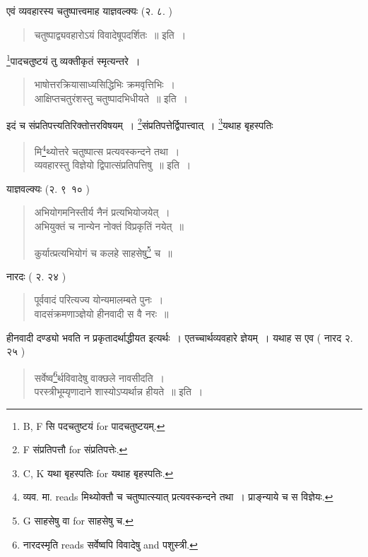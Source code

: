 \documentclass[11pt, openany]{book}
\begin{document}
एवं व्यवहारस्य चतुष्पात्त्वमाह याज्ञवल्क्यः (२. ८. )

\begin{quote}
{\vy चतुष्पाद्व्यवहारोऽयं विवादेषूपदर्शितः~॥} इति~।
\end{quote}

\renewcommand{\thefootnote}{2}\footnote{B, F सि पदचतुष्टयं for पादचतुष्टयम्.}पादचतुष्टयं तु व्यक्तीकृतं स्मृत्यन्तरे~। 

\begin{quote}
{\vy भाषोत्तरक्रियासाध्यसिद्धिभिः क्रमवृत्तिभिः~।\\
आक्षिप्तचतुरंशस्तु चतुष्पादभिधीयते~॥} इति~।
\end{quote}

इदं च संप्रतिपत्त्यतिरिक्तोत्तरविषयम्~। \renewcommand{\thefootnote}{3}\footnote{F संप्रतिपत्तौ for संप्रतिपत्तेः.}संप्रतिपत्तेर्द्विपात्त्वात्~। \renewcommand{\thefootnote}{4}\footnote{C, K यथा बृहस्पतिः for यथाह बृहस्पतिः.}यथाह बृहस्पतिः

\begin{quote}
{\vy मि\renewcommand{\thefootnote}{5}\footnote{व्यव. मा. reads मिथ्योक्तौ च चतुष्पात्स्यात् प्रत्यवस्कन्दने तथा~। प्राङ्न्याये च स विज्ञेयः.}थ्योत्तरे चतुष्पात्स प्रत्यवस्कन्दने तथा~।\\
व्यवहारस्तु विज्ञेयो द्विपात्संप्रतिपत्तिषु~॥} इति~।
\end{quote}

याज्ञवल्क्यः (२. ९\textendash\ १० ) 

\begin{quote}
{\vy अभियोगमनिस्तीर्य नैनं प्रत्यभियोजयेत्~।\\
अभियुक्तं च नान्येन नोक्तं विप्रकृतिं नयेत्~॥

कुर्यात्प्रत्यभियोगं च कलहे साहसेषु\renewcommand{\thefootnote}{6}\footnote{G साहसेषु वा for साहसेषु च.} च~॥}
\end{quote}

\newpage
{}

नारदः ( २. २४ ) 

\begin{quote}
{\vy पूर्ववादं परित्यज्य योन्यमालम्बते पुनः~।\\
वादसंक्रमणाञ्ज्ञेयो हीनवादी स वै नरः~॥}
\end{quote}

हीनवादी दण्ड्यो भवति न प्रकृतादर्थाद्धीयत इत्यर्थः~। एतच्चार्थव्यवहारे ज्ञेयम्~। यथाह स एव ( नारद २. २५ )

\begin{quote}
{\vy सर्वेष्व\renewcommand{\thefootnote}{1}\footnote{नारदस्मृति reads सर्वेष्वपि विवादेषु and पशुस्त्री.}र्थविवादेषु वाक्छले नावसीदति~।\\
परस्त्रीभूम्यृणादाने शास्योऽप्यर्थान्न हीयते~॥} इति~।
\end{quote}
\end{document}
